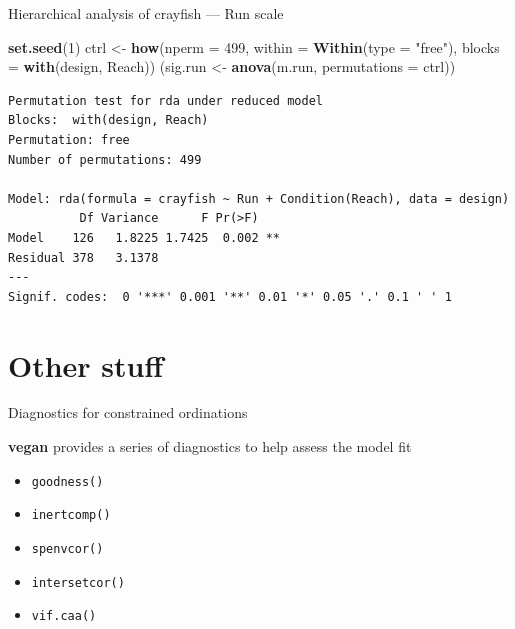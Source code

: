 \documentclass[10pt,ignorenonframetext,compress, aspectratio=169]{beamer}
\newenvironment{Shaded}{\begin{snugshade}}{\end{snugshade}}
\newcommand{\KeywordTok}[1]{\textcolor[rgb]{0.13,0.29,0.53}{\textbf{{#1}}}}
\newcommand{\DataTypeTok}[1]{\textcolor[rgb]{0.13,0.29,0.53}{{#1}}}
\newcommand{\DecValTok}[1]{\textcolor[rgb]{0.00,0.00,0.81}{{#1}}}
\newcommand{\StringTok}[1]{\textcolor[rgb]{0.31,0.60,0.02}{{#1}}}
\newcommand{\NormalTok}[1]{{#1}}
\providecommand{\tightlist}{%
  \setlength{\itemsep}{0pt}\setlength{\parskip}{0pt}}
\begin{document}
\begin{frame}[fragile]{Hierarchical analysis of crayfish --- Run scale}

\scriptsize

\begin{Shaded}
\begin{Highlighting}[]
\KeywordTok{set.seed}\NormalTok{(}\DecValTok{1}\NormalTok{)}
\NormalTok{ctrl <-}\StringTok{ }\KeywordTok{how}\NormalTok{(}\DataTypeTok{nperm =} \DecValTok{499}\NormalTok{, }\DataTypeTok{within =} \KeywordTok{Within}\NormalTok{(}\DataTypeTok{type =} \StringTok{"free"}\NormalTok{),}
            \DataTypeTok{blocks =} \KeywordTok{with}\NormalTok{(design, Reach))}
\NormalTok{(sig.run <-}\StringTok{ }\KeywordTok{anova}\NormalTok{(m.run, }\DataTypeTok{permutations =} \NormalTok{ctrl))}
\end{Highlighting}
\end{Shaded}

\begin{verbatim}
Permutation test for rda under reduced model
Blocks:  with(design, Reach) 
Permutation: free
Number of permutations: 499

Model: rda(formula = crayfish ~ Run + Condition(Reach), data = design)
          Df Variance      F Pr(>F)   
Model    126   1.8225 1.7425  0.002 **
Residual 378   3.1378                 
---
Signif. codes:  0 '***' 0.001 '**' 0.01 '*' 0.05 '.' 0.1 ' ' 1
\end{verbatim}

\normalsize

\end{frame}

\section{Other stuff}\label{other-stuff}

\begin{frame}[fragile]{Diagnostics for constrained ordinations}

\textbf{vegan} provides a series of diagnostics to help assess the model
fit

\begin{itemize}
\tightlist
\item
  \texttt{goodness()}
\item
  \texttt{inertcomp()}
\item
  \texttt{spenvcor()}
\item
  \texttt{intersetcor()}
\item
  \texttt{vif.caa()}
\end{itemize}

\end{frame}
\end{document}
